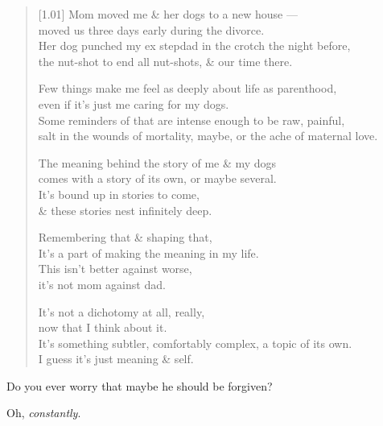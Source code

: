 \begin{paracol}{2}
\begin{leftcolumn}
\begin{verse}[1.01\textwidth]
  Mom moved me \& her dogs to a new house ---\\
  \vin moved us three days early during the divorce.\\
  Her dog punched my ex stepdad in the crotch the night before,\\
  \vin the nut-shot to end all nut-shots, \& our time there.

  Few things make me feel as deeply about life as parenthood,\\
  \vin even if it's just me caring for my dogs.\\
  Some reminders of that are intense enough to be raw, painful,\\
  \vin salt in the wounds of mortality, maybe, or the ache of maternal love.

  The meaning behind the story of me \& my dogs\\
  \vin comes with a story of its own, or maybe several.\\
  It's bound up in stories to come,\\
  \vin \& these stories nest infinitely deep.

  Remembering that \& shaping that,\\
  \vin It's a part of making the meaning in my life.\\
  This isn't better against worse,\\
  \vin it's not mom against dad.

  It's not a dichotomy at all, really,\\
  \vin now that I think about it.\\
  It's something subtler, comfortably complex, a topic of its own.\\
  \vin I guess it's just meaning \& self.
\end{verse}

\newpage

\null
\vfill
\begin{ally}
Do you ever worry that maybe he should be forgiven?
\end{ally}
Oh, \emph{constantly}.
\vfill
\newpage
\end{leftcolumn}
\end{paracol}
\resetbackgroundcolor
